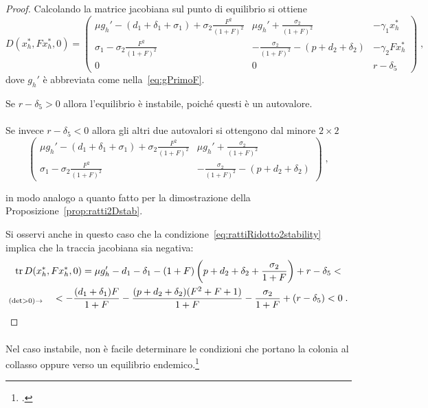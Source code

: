 \begin{proof}
Calcolando la matrice jacobiana sul punto di equilibrio si ottiene
$$ D (x_h^* , F x_h^* , 0) =
\begin{pmatrix}
    \mu g_h' - (d_1 +\delta_1 +\sigma_1) + \sigma_2 \frac{F^2}{(1+F)^2} &
    \mu g_h' + \frac{\sigma_2}{(1+F)^2} &
    -\gamma_1 x_h^*
    \\
    \sigma_1 - \sigma_2 \frac{F^2}{(1+F)^2} &
    - \frac{\sigma_2}{(1+F)^2} - ( p +d_2 +\delta_2) &
    - \gamma_2 F x_h^*
    \\
    0 &
    0 &
    r -\delta_5
    \end{pmatrix}
    \; ,
$$
dove $g_h'$ è abbreviata come nella~\eqref{eq:gPrimoF}.

Se $r -\delta_5 > 0$ allora l'equilibrio è instabile, poiché questi è un autovalore.

\paragraph{}
Se invece $r - \delta_5 <0$ allora gli altri due autovalori si ottengono dal minore $2 \times 2$
$$ %
\begin{pmatrix}
    \mu g_h' - (d_1 +\delta_1 +\sigma_1) + \sigma_2 \frac{F^2}{(1+F)^2} &
    \mu g_h' + \frac{\sigma_2}{(1+F)^2}
    \\
    \sigma_1 - \sigma_2 \frac{F^2}{(1+F)^2} &
    - \frac{\sigma_2}{(1+F)^2} - ( p +d_2 +\delta_2)
    \end{pmatrix}
    \; ,
$$

in modo analogo a quanto fatto
per la dimostrazione della Proposizione~\ref{prop:ratti2Dstab}.

Si osservi anche in questo caso che la condizione~\eqref{eq:rattiRidotto2stability} implica che la traccia
jacobiana sia negativa:
\begin{multline*}
\operatorname{tr} D (x_h^* , F x_h^* , 0) = \mu g_h' - d_1 -\delta_1 - (1+F) \left( p + d_2 + \delta_2 + \frac{\sigma_2}{1+F} \right)
+ r - \delta_5 < \\
 _{(\det >0) \rightarrow} \quad
< - \frac{(d_1+\delta_1) F}{1+F} - \frac{(p +d_2+\delta_2) (F^2 +F+1)}{1+F} - \frac{\sigma_2}{1+F}  + (r -\delta_5) < 0 \; .
\end{multline*}

\end{proof}

\paragraph{}
Nel caso instabile, non è facile determinare le condizioni che portano la colonia al collasso oppure
verso un equilibrio endemico.\footcite[15]{ratti2017}



